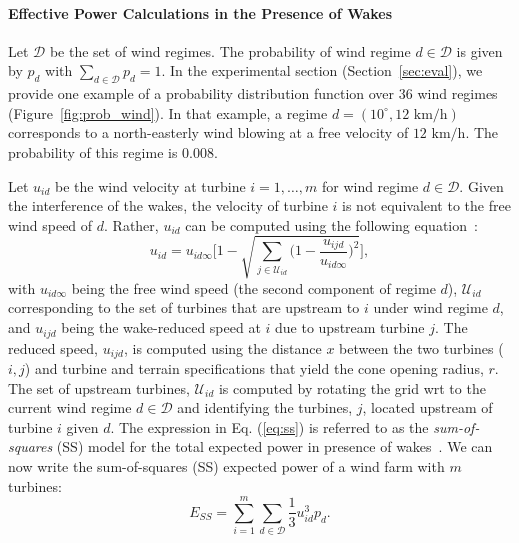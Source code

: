\documentclass[preprint,12pt]{elsarticle}
\begin{document}
\paragraph{Effective Power Calculations in the Presence of Wakes} 
Let $\mathcal{D}$ be the set of wind regimes.
The probability of wind regime 
$d \in \mathcal{D}$ is given by $p_d$ with $\sum_{d \in \mathcal{D}}^{} p_d = 1$. In the experimental section (Section~\ref{sec:eval}),
we provide one example of a probability distribution 
function over $36$ wind regimes (Figure~\ref{fig:prob_wind}). In that example, 
a regime $d=(10^\circ, 12 \mbox{ km/h})$ corresponds to a north-easterly wind blowing at a free velocity of $12\mbox{ km/h}$. The
probability of this regime is $0.008$.

Let $u_{id}$ be the wind velocity at turbine $i = 1,\ldots, m$ for wind regime $d\in\mathcal{D}$.
  Given the interference of the wakes, the velocity of turbine $i$ is not equivalent to the free wind speed of $d$.
Rather, $u_{id}$ can be computed using the following equation~\cite{Zhang2014}:
\begin{equation}
u_{id} = u_{id\infty} \Bigg[1 - \sqrt{\sum_{j\in\mathcal{U}_{id}} \bigg( 1-\frac{u_{ijd}}{u_{id\infty}} \bigg)^2}  \Bigg], \label{eq:ss}
\end{equation} with $u_{id\infty}$ being the free wind speed (the second component of regime $d$), $\mathcal{U}_{id}$ corresponding to the set of turbines  that are upstream to $i$ 
under wind regime $d$, and $u_{ijd}$ being the wake-reduced speed at $i$ due to upstream turbine $j$. 
The reduced speed, $u_{ijd}$, is computed using the distance $x$ between the two turbines ($i,j$)  and turbine and terrain specifications that yield the cone opening radius, $r$. The set of upstream turbines, $\mathcal{U}_{id}$ is computed  
by rotating the grid wrt to the current wind regime $d \in \mathcal{D}$ and identifying the turbines, $j$, located upstream of turbine $i$ given $d$. The expression in Eq. (\ref{eq:ss}) is referred to as the \emph{sum-of-squares} (SS) model for 
the total expected power in presence of wakes~\cite{Zhang2014}.  We can now write 
the sum-of-squares (SS) expected power of a wind farm with $m$ turbines:
\begin{equation}
  E_{SS} = \sum_{i=1}^m \sum_{d\in\mathcal{D}} \frac{1}{3} u_{id}^3p_d.\label{eq:ess}
\end{equation}
\end{document}
